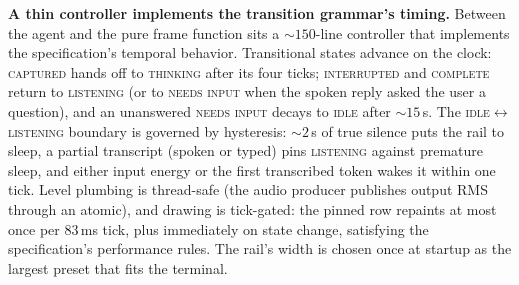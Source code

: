 \documentclass[11pt]{article}
\newcommand{\railstate}[1]{\textsc{#1}}
\begin{document}
\textbf{A thin controller implements the transition grammar's timing.} Between the
agent and the pure frame function sits a ${\sim}150$-line controller
that implements the specification's temporal behavior. Transitional
states advance on the clock: \railstate{captured} hands off to
\railstate{thinking} after its four ticks; \railstate{interrupted} and
\railstate{complete} return to \railstate{listening} (or to \railstate{needs input} when the spoken reply asked the user a question), and an unanswered \railstate{needs input} decays to
\railstate{idle} after ${\sim}15$\,s. The
\railstate{idle}$\leftrightarrow$\railstate{listening} boundary is
governed by hysteresis: ${\sim}2$\,s of true silence puts the rail to
sleep, a partial transcript (spoken or typed) pins \railstate{listening}
against premature sleep, and either input energy or the first
transcribed token wakes it within one tick. Level plumbing is thread-safe (the audio producer publishes output RMS through an atomic), and drawing is tick-gated: the pinned row repaints at most once
per 83\,ms tick, plus immediately on state change, satisfying the
specification's performance rules. The rail's width is chosen once at
startup as the largest preset that fits the terminal.
\end{document}
